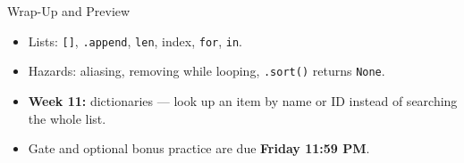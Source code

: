 \documentclass{beamer}
\begin{document}
\begin{frame}{Wrap-Up and Preview}
\begin{itemize}
    \item Lists: \texttt{[]}, \texttt{.append}, \texttt{len}, index, \texttt{for}, \texttt{in}.
    \item Hazards: aliasing, removing while looping, \texttt{.sort()} returns \texttt{None}.
    \item \textbf{Week 11:} dictionaries --- look up an item by name or ID instead of searching the whole list.
    \item Gate and optional bonus practice are due \textbf{Friday 11:59 PM}.
\end{itemize}
\end{frame}
\end{document}
